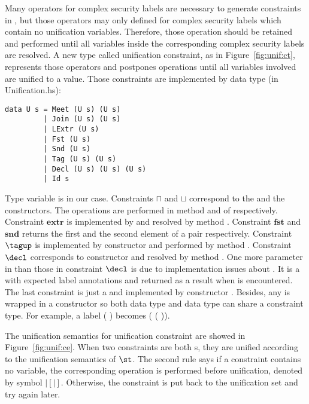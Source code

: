 Many operators for complex security labels are necessary to generate constraints in , but
those operators may only defined for complex security labels which contain no unification variables. 
Therefore, those operation should be retained and performed until all variables inside the corresponding complex
security labels are resolved. A new type called unification constraint, as in Figure~\ref{fig:unif:ct}, 
represents those operators and postpones operations until all variables involved are unified to a value.
Those constraints are implemented by data type (in Unification.hs):
\begin{verbatim}
data U s = Meet (U s) (U s)
         | Join (U s) (U s)
         | LExtr (U s)
         | Fst (U s)
         | Snd (U s)
         | Tag (U s) (U s)
         | Decl (U s) (U s) (U s)
         | Id s
\end{verbatim}
Type variable  is  in our case. 
Constraints $\sqcap$ and $\sqcup$ correspond to the  and the  constructors. 
The operations are performed in method  and  of  respectively. 
Constraint $\mathbf{extr}$ is implemented by  and resolved by method .
Constraint $\mathbf{fst}$ and $\mathbf{snd}$ returns the first and the second element of a pair respectively.
Constraint $\tagup$ is implemented by constructor  and performed by method .
Constraint $\decl$ corresponds to constructor  and resolved by method . One more
parameter in  than those in constraint $\decl$ is due to implementation issues about . 
It is a  with expected label annotations and returned as a result when  is encountered.
The last constraint is just a  and implemented by constructor .
Besides, any  is wrapped in a  constructor so both data type  and data type 
 can share a constraint type. For example, a label ( ) becomes 
( ( )).

The unification semantics for unification constraint are showed in Figure~\ref{fig:unif:ce}. When two constraints
are both s, they are unified according to the unification semantics of $\st$. The second rule says
if a constraint contains no variable, the corresponding operation is performed before unification, 
denoted by symbol $|[|]$. Otherwise, the constraint is put back to the unification set and try again later.

